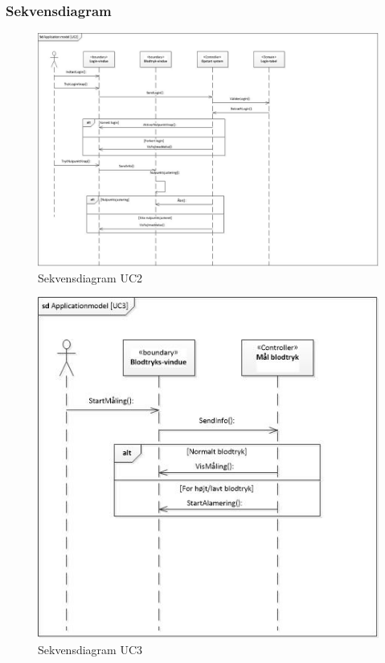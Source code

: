 \subsubsection{Sekvensdiagram}
\begin{figure}
	\includegraphics[width=1\textwidth]{Figurer/sdAppModelUC2}
	\caption{Sekvensdiagram UC2}
\end{figure}

\begin{figure}
	\includegraphics[width=1\textwidth]{Figurer/sdAppModelUC3}
	\caption{Sekvensdiagram UC3}
\end{figure}

